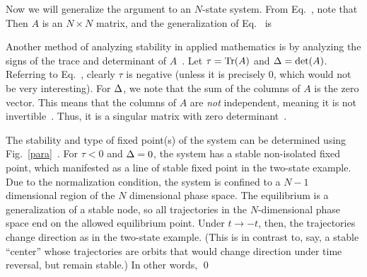 {	Now we will generalize the argument to an $N$-state system.  From Eq.~, note that
	Then $A$ is an $N \times N$ matrix,
	and the generalization of Eq.~ is
	
	Another method of analyzing stability in applied mathematics is by analyzing the signs of the trace and determinant of $A$~\cite[pp.~136--137]{Strogatz}.  Let $\tau = \Tr(A)$ and $\Delta = \det(A)$.  Referring to Eq.~, clearly $\tau$ is negative (unless it is precisely 0, which would not be very interesting).  For $\Delta$, we note that the sum of the columns of $A$ is the zero vector.  This means that the columns of $A$ are \emph{not} independent, meaning it is not invertible~\cite{Invertible}.  Thus, it is a singular matrix with zero determinant~\cite{Singular}.
	
	The stability and type of fixed point(s) of the system can be determined using Fig.~\ref{para}~\cite[p.~137]{Strogatz}.  For $\tau < 0$ and $\Delta = 0$, the system has a stable non-isolated fixed point, which manifested as a line of stable fixed point in the two-state example.  Due to the normalization condition, the system is confined to a $N - 1$ dimensional region of the $N$ dimensional phase space.  The equilibrium is a generalization of a stable node, so all trajectories in the $N$-dimensional phase space end on the allowed equilibrium point.  Under $t \to -t$, then, the trajectories change direction as in the two-state example.  (This is in contrast to, say, a stable ``center'' whose trajectories are orbits that would change direction under time reversal, but remain stable.)  In other words,  \qed
	
}
